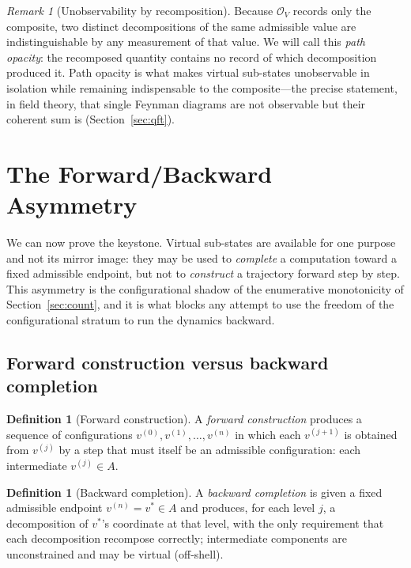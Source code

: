 \documentclass[11pt,a4paper]{article}
\theoremstyle{thmstyle}
\theoremstyle{definition}
\newtheorem{definition}[theorem]{Definition}
\theoremstyle{remark}
\newtheorem{remark}[theorem]{Remark}
\newcommand{\Obs}{\mathcal{O}}
\begin{document}
\begin{remark}[Unobservability by recomposition]
\label{rem:pathopacity}
Because $\Obs_V$ records only the composite, two distinct decompositions
of the same admissible value are indistinguishable by any measurement of
that value. We will call this \emph{path opacity}: the recomposed quantity
contains no record of which decomposition produced it. Path opacity is
what makes virtual sub-states unobservable in isolation while remaining
indispensable to the composite---the precise statement, in field theory,
that single Feynman diagrams are not observable but their coherent sum is
(Section~\ref{sec:qft}).
\end{remark}

\section{The Forward/Backward Asymmetry}
\label{sec:asymmetry}

We can now prove the keystone. Virtual sub-states are available for one
purpose and not its mirror image: they may be used to \emph{complete} a
computation toward a fixed admissible endpoint, but not to \emph{construct}
a trajectory forward step by step. This asymmetry is the configurational
shadow of the enumerative monotonicity of Section~\ref{sec:count}, and it
is what blocks any attempt to use the freedom of the configurational
stratum to run the dynamics backward.

\subsection{Forward construction versus backward completion}
\label{sec:forwardbackward}

\begin{definition}[Forward construction]
\label{def:forward}
A \emph{forward construction} produces a sequence of configurations
$v^{(0)},v^{(1)},\dots,v^{(n)}$ in which each $v^{(j+1)}$ is obtained from
$v^{(j)}$ by a step that must itself be an admissible configuration: each
intermediate $v^{(j)}\in A$.
\end{definition}

\begin{definition}[Backward completion]
\label{def:backward}
A \emph{backward completion} is given a fixed admissible endpoint
$v^{(n)}=v^{\ast}\in A$ and produces, for each level $j$, a decomposition
of $v^{\ast}$'s coordinate at that level, with the only requirement that
each decomposition recompose correctly; intermediate components are
unconstrained and may be virtual (off-shell).
\end{definition}
\end{document}
